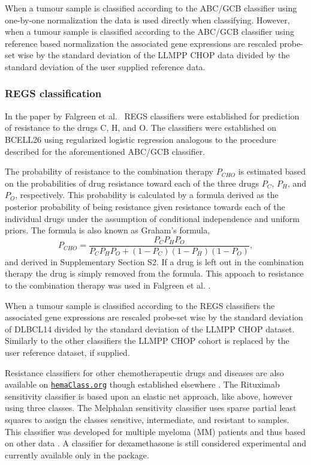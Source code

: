 \documentclass[twocolumn]{bmcart}%
\newcommand{\hemaClass}{\href{http://hemaClass.org}{\texttt{hemaClass.org}}}
\begin{document}
When a tumour sample is classified according to the ABC/GCB classifier using one-by-one normalization the data is used directly when classifying. However, when a tumour sample is classified according to the ABC/GCB classifier using reference based normalization the associated gene expressions are rescaled probe-set wise by the standard deviation of the LLMPP CHOP data divided by the standard deviation of the user supplied reference data.



\subsubsection{REGS classification}
\label{sec:regsmethods}
In the paper by Falgreen et al.~\cite{Falgreen2015} REGS classifiers were established for prediction of resistance to the drugs C, H, and O.
The classifiers were established on BCELL26 using regularized logistic regression analogous to the procedure described for the aforementioned ABC/GCB classifier.

The probability of resistance to the combination therapy $P_{CHO}$ is estimated based on the probabilities of drug resistance toward each of the three drugs $P_C$, $P_H$, and $P_O$, respectively.
This probability is calculated by a formula derived as the posterior probability of being resistance given resistance towards each of the individual drugs under the assumption of conditional independence and uniform priors.
The formula is also known as Graham's formula,
\begin{equation*}
  P_{CHO} = \frac{P_C P_H P_O}{P_C P_H P_O + (1 - P_C)(1 - P_H)(1 - P_O)},
\end{equation*}
and derived in Supplementary Section S2. If a drug is left out in the combination therapy the drug is simply removed from the formula.
This appoach to resistance to the combination therapy was used in Falgreen et al. \cite{Falgreen2015}.

When a tumour sample is classified according to the REGS classifiers the associated gene expressions are rescaled probe-set wise by the standard deviation of DLBCL14 divided by the standard deviation of the LLMPP CHOP dataset.
Similarly to the other classifiers the LLMPP CHOP cohort is replaced by the user reference dataset, if supplied.

Resistance classifiers for other chemotherapeutic drugs and diseases are also available on \hemaClass{} though established elsewhere \cite{Boegsted2011,Bogsted2013,Laursen2014,Laursen2015}.
The Rituximab sensitivity classifier \cite{Laursen2014, Laursen2015} is based upon an elastic net approach, like above, however using three classes.
The Melphalan sensitivity classifier \cite{Boegsted2011} uses sparse partial least squares to assign the classes sensitive, intermediate, and resistant to samples.
This classifier was developed for multiple myeloma (MM) patients and thus based on other data \cite{Boegsted2011}.
A classifier for dexamethasone is still considered experimental and currently available only in the package.
\end{document}
